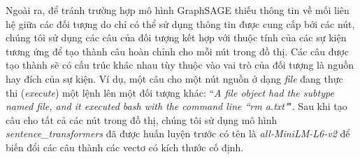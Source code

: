 \bigbreak\noindent
Ngoài ra, để tránh trường hợp mô hình GraphSAGE thiếu thông tin về mối liên hệ giữa các đối tượng do chỉ có thể sử dụng thông tin được cung cấp bởi các nút, chúng tôi sử dụng các câu của đối tượng kết hợp với thuộc tính của các sự kiện tương ứng để tạo thành câu hoàn chỉnh cho mỗi nút trong đồ thị. Các câu được tạo thành sẽ có cấu trúc khác nhau tùy thuộc vào vai trò của đối tượng là nguồn hay đích của sự kiện. Ví dụ, một câu cho một nút nguồn ở dạng \textit{file} đang thực thi (\textit{execute}) một lệnh lên một đối tượng khác: ``\textit{A file object had the subtype named file, and it executed bash with the command line ``rm a.txt"}". Sau khi tạo câu cho tất cả các nút trong đồ thị, chúng tôi sử dụng mô hình \emph{sentence\_transformers} \cite{reimers-2019-sentence-bert} đã được huấn luyện trước có tên là \emph{all-MiniLM-L6-v2} \cite{reimers-2020-multilingual-sentence-bert} để biến đổi các câu thành các vectơ có kích thước cố định.

